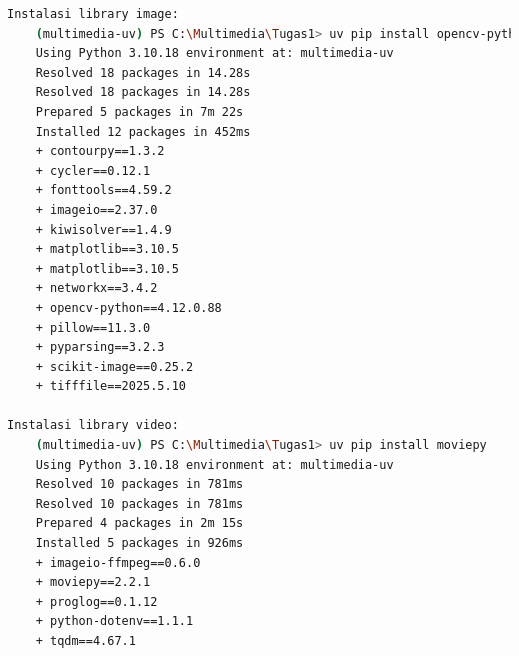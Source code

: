 \documentclass[11pt,a4paper]{article}
\begin{document}
\begin{itemize}
\begin{lstlisting}[language=bash, caption=Instalasi library umum]
Instalasi library image:
    (multimedia-uv) PS C:\Multimedia\Tugas1> uv pip install opencv-python pillow scikit-image matplotlib
    Using Python 3.10.18 environment at: multimedia-uv
    Resolved 18 packages in 14.28s
    Resolved 18 packages in 14.28s
    Prepared 5 packages in 7m 22s
    Installed 12 packages in 452ms
    + contourpy==1.3.2
    + cycler==0.12.1
    + fonttools==4.59.2
    + imageio==2.37.0
    + kiwisolver==1.4.9
    + matplotlib==3.10.5
    + matplotlib==3.10.5
    + networkx==3.4.2
    + opencv-python==4.12.0.88
    + pillow==11.3.0
    + pyparsing==3.2.3
    + scikit-image==0.25.2
    + tifffile==2025.5.10

Instalasi library video:
    (multimedia-uv) PS C:\Multimedia\Tugas1> uv pip install moviepy
    Using Python 3.10.18 environment at: multimedia-uv
    Resolved 10 packages in 781ms
    Resolved 10 packages in 781ms
    Prepared 4 packages in 2m 15s
    Installed 5 packages in 926ms
    + imageio-ffmpeg==0.6.0
    + moviepy==2.2.1
    + proglog==0.1.12
    + python-dotenv==1.1.1
    + tqdm==4.67.1


\end{lstlisting}
\end{itemize}
\end{document}
